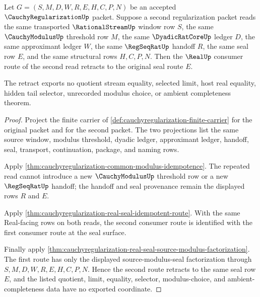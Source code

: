 \begin{theorem}
\label{thm:cauchyregularization-real-seal-normalization-retract}
Let $G=(S,M,D,W,R,E,H,C,P,N)$ be an accepted
$\CauchyRegularizationUp$ packet. Suppose a second regularization packet reads
the same transported $\RationalStreamUp$ window row $S$, the same
$\CauchyModulusUp$ threshold row $M$, the same $\DyadicRatCoreUp$ ledger $D$,
the same approximant ledger $W$, the same $\RegSeqRatUp$ handoff $R$, the same
seal row $E$, and the same structural rows $H,C,P,N$. Then the $\RealUp$
consumer route of the second read retracts to the original seal route $E$.

The retract exports no quotient stream equality, selected limit, host real
equality, hidden tail selector, unrecorded modulus choice, or ambient
completeness theorem.
\end{theorem}
\begin{proof}
Project the finite carrier of
\autoref{def:cauchyregularization-finite-carrier} for the original packet and
for the second packet. The two projections list the same source window,
modulus threshold, dyadic ledger, approximant ledger, handoff, seal,
transport, continuation, package, and naming rows.

Apply
\autoref{thm:cauchyregularization-common-modulus-idempotence}. The repeated
read cannot introduce a new $\CauchyModulusUp$ threshold row or a new
$\RegSeqRatUp$ handoff; the handoff and seal provenance remain the displayed
rows $R$ and $E$.

Apply \autoref{thm:cauchyregularization-real-seal-idempotent-route}. With the
same Real-facing rows on both reads, the second consumer route is identified
with the first consumer route at the seal surface.

Finally apply
\autoref{thm:cauchyregularization-real-seal-source-modulus-factorization}. The
first route has only the displayed source-modulus-seal factorization through
$S,M,D,W,R,E,H,C,P,N$. Hence the second route retracts to the same seal row
$E$, and the listed quotient, limit, equality, selector, modulus-choice, and
ambient-completeness data have no exported coordinate.
\end{proof}

